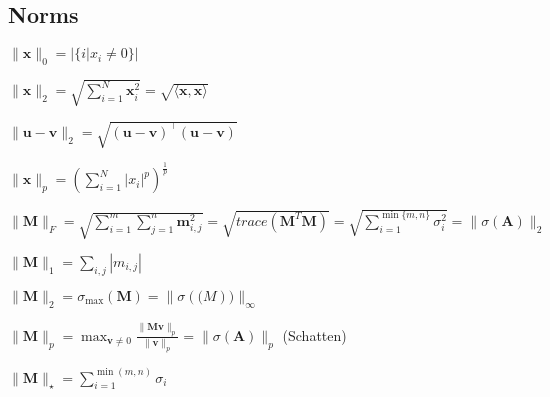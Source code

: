 \subsection*{Norms}
\begin{inparaitem}
	\item $\|\mathbf{x}\|_0 = |\{i | x_i \neq 0\}|$ \\
	\item $\|\mathbf{x}\|_2 = \sqrt{\sum_{i=1}^{N} \mathbf{x}_i^2} = \sqrt{\langle \mathbf{x}, \mathbf{x} \rangle}$ \\
	\item $\|\mathbf{u}-\mathbf{v}\|_2 = \sqrt{(\mathbf{u}-\mathbf{v})^\top(\mathbf{u}-\mathbf{v})}$ \\
	\item $\|\mathbf{x}\|_p = \left( \sum_{i=1}^{N} |x_i|^p \right)^{\frac{1}{p}}$ \\
	\item
	$\|\mathbf{M}\|_F =\allowbreak \sqrt{\sum_{i=1}^{m} \sum_{j=1}^{n}\mathbf{m}_{i,j}^2} = \sqrt{trace(\mathbf{M}^T\mathbf{M})} =\allowbreak \sqrt{\sum_{i=1}^{\min\{m, n\}} \sigma_i^2} = \|\sigma(\mathbf{A})\|_2 $\\
	\item
	$\|\mathbf{M}\|_1 = \sum_{i,j} | m_{i,j}|$ \\
	\item $\|\mathbf{M}\|_2 = \sigma_{\text{max}}(\mathbf{M}) = \|\sigma(\mathbf(M))\|_\infty$\\
	\item $\|\mathbf{M}\|_p = \max_{\mathbf{v} \neq 0} \frac{\|\mathbf{M}\mathbf{v}\|_p}{\|\mathbf{v}\|_p} = \|\sigma(\mathbf{A})\|_p$ (Schatten)\\
	\item $\|\mathbf{M}\|_\star = \sum_{i=1}^{\min(m, n)} \sigma_i$
\end{inparaitem}

